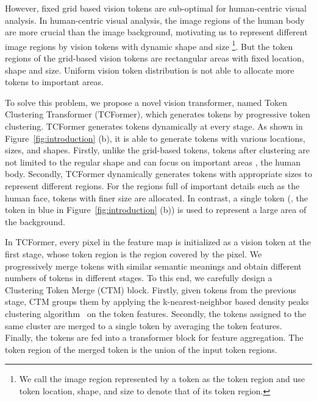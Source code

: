 \documentclass[10pt,twocolumn,letterpaper]{article}
\begin{document}
However, fixed grid based vision tokens are sub-optimal for human-centric visual analysis. 
In human-centric visual analysis, the image regions of the human body are more crucial than the image background, motivating us to represent different image regions by vision tokens with dynamic shape and size
\footnote{
We call the image region represented by a token as the token region and use token location, shape, and size to denote that of its token region.}. 
But the token regions of the grid-based vision tokens are rectangular areas with fixed location, shape and size. 
Uniform vision token distribution is not able to allocate more tokens to important areas.





To solve this problem, we propose a novel vision transformer, named Token Clustering Transformer (TCFormer), which generates tokens by progressive token clustering. 
TCFormer generates tokens dynamically at every stage. 
As shown in Figure~\ref{fig:introduction} (b), it is able to generate tokens with various locations, sizes, and shapes.
Firstly, unlike the grid-based tokens, tokens after clustering are not limited to the regular shape and can focus on important areas \eg, the human body. 
Secondly, TCFormer dynamically generates tokens with appropriate sizes to represent different regions. For the regions full of important details such as the human face, tokens with finer size are allocated. 
In contrast, a single token (\eg, the token in blue in Figure~\ref{fig:introduction} (b)) is used to represent a large area of the background.

In TCFormer, every pixel in the feature map is initialized as a vision token at the first stage, whose token region is the region covered by the pixel.
We progressively merge tokens with similar semantic meanings and obtain different numbers of tokens in different stages.
To this end, we carefully design a Clustering Token Merge (CTM) block. 
Firstly, given tokens from the previous stage, CTM groups them by applying the k-nearest-neighbor based density peaks clustering algorithm~\cite{du2016study} on the token features.
Secondly, the tokens assigned to the same cluster are merged to a single token by averaging the token features.
Finally, the tokens are fed into a transformer block for feature aggregation.
The token region of the merged token is the union of the input token regions.
\end{document}
